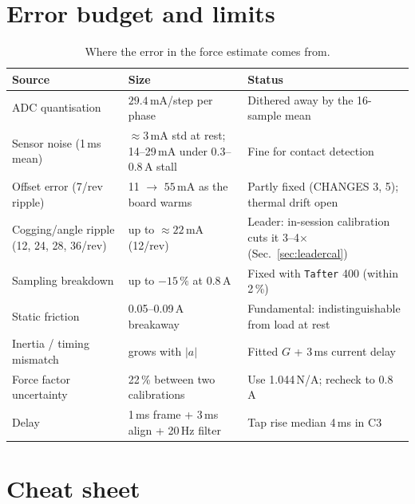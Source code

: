 \documentclass[11pt,a4paper]{article}
\newcommand{\mA}{\,\mathrm{mA}}
\begin{document}
\section{Error budget and limits}

\begin{table}[h]
\centering
\small
\begin{tabular}{@{}>{\raggedright}p{3.6cm}>{\raggedright}p{3.4cm}>{\raggedright\arraybackslash}p{6.4cm}@{}}
\toprule
Source & Size & Status \\
\midrule
ADC quantisation & $29.4\mA$/step per phase & Dithered away by the 16-sample mean \\
Sensor noise (1\,ms mean) & $\approx 3\mA$ std at rest; 14--29\,mA under 0.3--0.8\,A stall & Fine for contact detection \\
Offset error (7/rev ripple) & 11 $\to$ $55\mA$ as the board warms & Partly fixed (CHANGES 3, 5); thermal drift open \\
Cogging/angle ripple (12, 24, 28, 36/rev) & up to $\approx 22\mA$ (12/rev) & Leader: in-session calibration cuts it 3--4$\times$ (Sec.~\ref{sec:leadercal}) \\
Sampling breakdown & up to $-15\,\%$ at 0.8\,A & Fixed with \texttt{Tafter} 400 (within 2\,\%) \\
Static friction & 0.05--0.09\,A breakaway & Fundamental: indistinguishable from load at rest \\
Inertia / timing mismatch & grows with $|a|$ & Fitted $G$ + 3\,ms current delay \\
Force factor uncertainty & 22\,\% between two calibrations & Use 1.044\,N/A; recheck to 0.8\,A \\
Delay & 1\,ms frame + 3\,ms align + 20\,Hz filter & Tap rise median 4\,ms in C3 \\
\bottomrule
\end{tabular}
\caption{Where the error in the force estimate comes from.}
\end{table}

\section{Cheat sheet}
\end{document}
